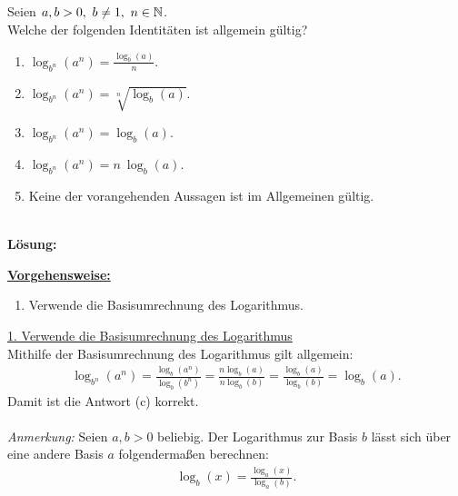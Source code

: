 \newpage
\subsection*{}
Seien $ a,b >0, \ b \neq 1 , \ n \in \mathbb{N}  $.\\
Welche der folgenden Identitäten ist allgemein gültig?
\renewcommand{\labelenumi}{(\alph{enumi})}
\begin{enumerate}
	\item 
	$ \log_{b^n}(a^n) = \frac{\log_{b}(a)}{n} $.
	\item 
	$ \log_{b^n}(a^n) = \sqrt[n]{\log_{b}(a)} $.
	\item
	$ \log_{b^n}(a^n) = \log_{b}(a) $.
	\item
	$ \log_{b^n}(a^n) = n \ \log_{b}(a) $.
	\item
	Keine der vorangehenden Aussagen ist im Allgemeinen gültig.
\end{enumerate}
\ \\
\textbf{Lösung:}
\begin{mdframed}
\underline{\textbf{Vorgehensweise:}}
\renewcommand{\labelenumi}{\theenumi.}
\begin{enumerate}
\item Verwende die Basisumrechnung des Logarithmus.
\end{enumerate}
\end{mdframed}

\underline{1. Verwende die Basisumrechnung des Logarithmus}\\
Mithilfe der Basisumrechnung des Logarithmus gilt allgemein:
\begin{align*}
	\log_{b^n}(a^n)
	=
	\frac{\log_{b}(a^n)}{\log_{b}(b^n)}
	=
	\frac{n \log_{b}(a)}{n \log_b(b)}
	=
	\frac{\log_b(a)}{\log_{b}(b)}
	=
	\log_{b}(a).
\end{align*}
Damit ist die Antwort (c) korrekt.\\
\\
\textit{Anmerkung:}
Seien $a,b>0$ beliebig. Der Logarithmus zur Basis $ b $ lässt sich über eine andere Basis $ a $ folgendermaßen berechnen:
\begin{align*}
	\log_b(x) = \frac{\log_a(x)}{\log_a(b)}.
\end{align*}


 \newpage


